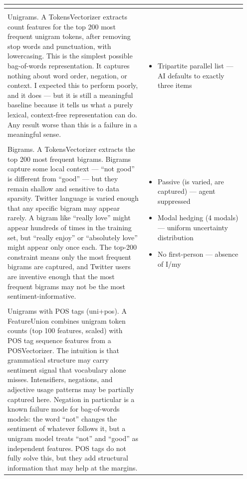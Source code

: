 \documentclass[11pt]{article}
\begin{document}
\begin{longtable}{|p{0.55\linewidth}|p{0.40\linewidth}|}
\begin{itemize}[leftmargin=1em,itemsep=1pt,topsep=1pt,parsep=0pt]
\end{itemize} \\[2pt]
\hline
\rule[-3.5cm]{0pt}{3.5cm} & \\
\hline
Unigrams. A TokensVectorizer extracts count features for the top 200 most frequent unigram tokens, after removing stop words and punctuation, with lowercasing. This is the simplest possible bag-of-words representation. It captures nothing about word order, negation, or context. I expected this to perform poorly, and it does --- but it is still a meaningful baseline because it tells us what a purely lexical, context-free representation can do. Any result worse than this is a failure in a meaningful sense. & \begin{itemize}[leftmargin=1em,itemsep=1pt,topsep=1pt,parsep=0pt]
  \item Tripartite parallel list --- AI defaults to exactly three items
\end{itemize} \\[2pt]
\hline
\rule[-3.5cm]{0pt}{3.5cm} & \\
\hline
Bigrams. A TokensVectorizer extracts the top 200 most frequent bigrams. Bigrams capture some local context --- ``not good'' is different from ``good'' --- but they remain shallow and sensitive to data sparsity. Twitter language is varied enough that any specific bigram may appear rarely. A bigram like ``really love'' might appear hundreds of times in the training set, but ``really enjoy'' or ``absolutely love'' might appear only once each. The top-200 constraint means only the most frequent bigrams are captured, and Twitter users are inventive enough that the most frequent bigrams may not be the most sentiment-informative. & \begin{itemize}[leftmargin=1em,itemsep=1pt,topsep=1pt,parsep=0pt]
  \item Passive (is varied, are captured) --- agent suppressed
  \item Modal hedging (4 modals) --- uniform uncertainty distribution
  \item No first-person --- absence of I/my
\end{itemize} \\[2pt]
\hline
\rule[-3.5cm]{0pt}{3.5cm} & \\
\hline
Unigrams with POS tags (uni+pos). A FeatureUnion combines unigram token counts (top 100 features, scaled) with POS tag sequence features from a POSVectorizer. The intuition is that grammatical structure may carry sentiment signal that vocabulary alone misses. Intensifiers, negations, and adjective usage patterns may be partially captured here. Negation in particular is a known failure mode for bag-of-words models: the word ``not'' changes the sentiment of whatever follows it, but a unigram model treats ``not'' and ``good'' as independent features. POS tags do not fully solve this, but they add structural information that may help at the margins. & \begin{itemize}[leftmargin=1em,itemsep=1pt,topsep=1pt,parsep=0pt]

\end{itemize}
\end{longtable}
\end{document}
